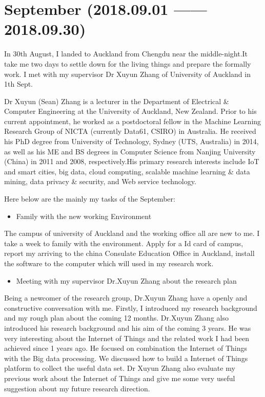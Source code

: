 \documentclass[12pt]{article}
\begin{document}
\section{September  \small{(2018.09.01 —— 2018.09.30)} }
In 30th August, I landed to Auckland from Chengdu near the middle-night.It take me two days to settle down for the living things and prepare the formally work.
I met with my supervisor Dr Xuyun Zhang of University of Auckland in 1th Sept.  
\par
Dr Xuyun (Sean) Zhang is a lecturer in the Department of Electrical \& Computer Engineering at the University of Auckland, New Zealand. Prior to his current appointment, he worked as a postdoctoral fellow in the Machine Learning Research Group of NICTA (currently Data61, CSIRO) in Australia. He received his PhD degree from University of Technology, Sydney (UTS, Australia) in 2014, as well as his ME and BS degrees in Computer Science from Nanjing University (China) in 2011 and 2008, respectively.His primary research interests include IoT and smart cities, big data, cloud computing, scalable machine learning \& data mining, data privacy \& security, and Web service technology.
\par
Here below are the mainly my tasks of the September:
\begin{itemize}
    \item Family with the new working Environment
\end{itemize}
\par \vspace{-0.4cm} 
The campus of university of Auckland and the working office all are new to me. I take a week to family with the environment. Apply for a Id card of campus, report my arriving to the china Consulate Education Office in Auckland, install the software to the computer which will used in my research work.
\begin{itemize}
    \item Meeting with my supervisor Dr.Xuyun Zhang about the research plan
\end{itemize}
\par \vspace{-0.4cm}
Being a newcomer of the research group, Dr.Xuyun Zhang have a openly and constructive conversation with me. Firstly, I introduced my research background and my rough plan about the coming 12 months. Dr.Xuyun Zhang also introduced his research background and his aim of the coming 3 years. He was very interesting about the Internet of Things and the related work I had been achieved since 1 years ago. He focused on combination the Internet of Things with the Big data processing. We discussed how to build a Internet of Things platform to collect the useful data set. Dr Xuyun Zhang also evaluate my previous work about the Internet of Things and give me some very useful suggestion about my future research direction.
\end{document}
